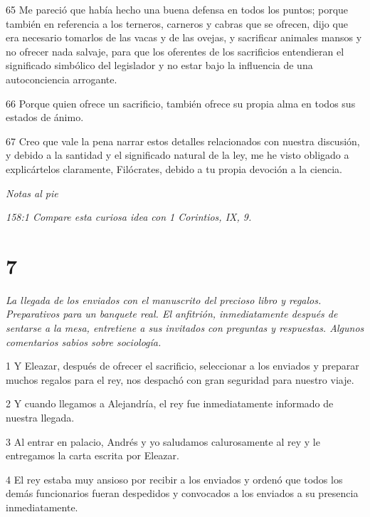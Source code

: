 \par 65 Me pareció que había hecho una buena defensa en todos los puntos; porque también en referencia a los terneros, carneros y cabras que se ofrecen, dijo que era necesario tomarlos de las vacas y de las ovejas, y sacrificar animales mansos y no ofrecer nada salvaje, para que los oferentes de los sacrificios entendieran el significado simbólico del legislador y no estar bajo la influencia de una autoconciencia arrogante.

\par 66 Porque quien ofrece un sacrificio, también ofrece su propia alma en todos sus estados de ánimo.

\par 67 Creo que vale la pena narrar estos detalles relacionados con nuestra discusión, y debido a la santidad y el significado natural de la ley, me he visto obligado a explicártelos claramente, Filócrates, debido a tu propia devoción a la ciencia.

\par \textit{Notas al pie}

\par \textit{158:1 Compare esta curiosa idea con 1 Corintios, IX, 9.}

\chapter{7}

\par \textit{La llegada de los enviados con el manuscrito del precioso libro y regalos. Preparativos para un banquete real. El anfitrión, inmediatamente después de sentarse a la mesa, entretiene a sus invitados con preguntas y respuestas. Algunos comentarios sabios sobre sociología.}

\par 1 Y Eleazar, después de ofrecer el sacrificio, seleccionar a los enviados y preparar muchos regalos para el rey, nos despachó con gran seguridad para nuestro viaje.

\par 2 Y cuando llegamos a Alejandría, el rey fue inmediatamente informado de nuestra llegada.

\par 3 Al entrar en palacio, Andrés y yo saludamos calurosamente al rey y le entregamos la carta escrita por Eleazar.

\par 4 El rey estaba muy ansioso por recibir a los enviados y ordenó que todos los demás funcionarios fueran despedidos y convocados a los enviados a su presencia inmediatamente.


